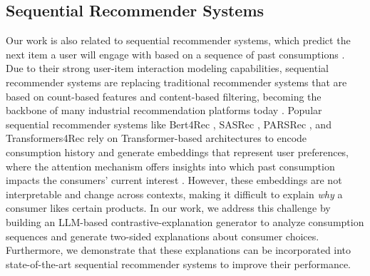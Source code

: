 \subsection{Sequential Recommender Systems} 
Our work is also related to sequential recommender systems, which predict the next item a user will engage with based on a sequence of past consumptions \citep{wang2019sequential}. Due to their strong user-item interaction modeling capabilities, sequential recommender systems are replacing traditional recommender systems that are based on count-based features and content-based filtering, becoming the backbone of many industrial recommendation platforms today \citep{chen2019top, zhai2024actions}. Popular sequential recommender systems like Bert4Rec \citep{sun2019bert4rec}, SASRec \citep{kang2018self}, PARSRec \citep{gholami2022parsrec}, and Transformers4Rec \citep{de2021transformers4rec} rely on Transformer-based architectures \citep{vaswani2017attention} to encode consumption history and generate embeddings that represent user preferences, where the attention mechanism offers insights into which past consumption impacts the consumers' current interest \citep{gholami2022parsrec}. However, these embeddings are not interpretable and change across contexts, making it difficult to explain \emph{why} a consumer likes certain products. In our work, we address this challenge by building an LLM-based contrastive-explanation generator to analyze consumption sequences and generate two-sided explanations about consumer choices. Furthermore, we demonstrate that these explanations can be incorporated into state-of-the-art sequential recommender systems to improve their performance.


\begin{comment}

\subsection{Large Language Models for Consumer Insights}
Mainly for summarizing behavioral insights, use as data scientists. To the best of our knowledge, little work on using the extracted insights to improve recsys 

\end{comment}